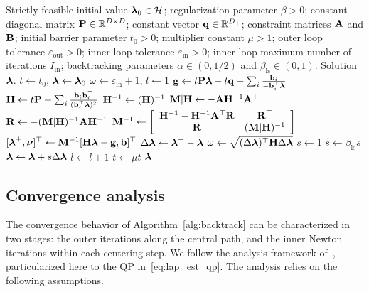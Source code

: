 \begin{algorithm}[t]
	\caption{Laplacian projection via IPM}
	\label{alg:backtrack}
	\begin{algorithmic}[1]
		\renewcommand{\algorithmicrequire}{\textbf{Input:}}
		\renewcommand{\algorithmicensure}{\textbf{Output:}}
		\Require Strictly feasible initial value $\boldsymbol{\lambda}_0\in\mathcal{H}$; regularization parameter $\beta>0$; constant diagonal matrix $\mathbf{P}\in\mathbb{R}^{D\times D}$; constant vector $\mathbf{q}\in\mathbb{R}^{D_+}$; constraint matrices $\mathbf{A}$ and $\mathbf{B}$; initial barrier parameter $t_0>0$; multiplier constant $\mu>1$; outer loop tolerance $\varepsilon_\text{out}>0$; inner loop tolerance $\varepsilon_\text{in}>0$; inner loop maximum number of iterations $I_\text{in}$; backtracking parameters $\alpha\in(0,1/2)$ and $\beta_\text{ls}\in(0,1)$.
		\Ensure Solution $\boldsymbol{\lambda}$.
		\State $t\gets t_0$, $\boldsymbol{\lambda}\gets \boldsymbol{\lambda}_0$
		\State $\omega\gets \varepsilon_\text{in}+1$, $l\gets 1$
		\State $\mathbf{g} \gets t\mathbf{P}\boldsymbol{\lambda} - t\mathbf{q} + \sum_i\frac{\mathbf{b}_i}{-\mathbf{b}_i^\top\boldsymbol{\lambda}}$
		\State $\mathbf{H}\gets t\mathbf{P} + \sum_i\frac{\mathbf{b}_i\mathbf{b}_i^\top}{(\mathbf{b}_i^\top\boldsymbol{\lambda})^2}$
		\State $\mathbf{H}^{-1}\gets (\mathbf{H})^{-1}$
		\State $\mathbf{M}|\mathbf{H}\gets -\mathbf{A}\mathbf{H}^{-1}\mathbf{A}^\top$
		\State $\mathbf{R}\gets -(\mathbf{M}|\mathbf{H})^{-1}\mathbf{A}\mathbf{H}^{-1}$
		\State $\mathbf{M}^{-1} \gets \left[
		\begin{array}{cc}
			\mathbf{H}^{-1} - \mathbf{H}^{-1}\mathbf{A}^\top\mathbf{R}  & \mathbf{R}^\top \\
			\mathbf{R} & (\mathbf{M}|\mathbf{H})^{-1}
		\end{array}
		\right]$
		\State $[\boldsymbol{\lambda}^+, \boldsymbol{\nu}]^\top \gets \mathbf{M}^{-1}[\mathbf{H}\boldsymbol{\lambda}-\mathbf{g},\mathbf{b}]^\top$
		\State $\Delta\boldsymbol{\lambda} \gets \boldsymbol{\lambda}^+ - \boldsymbol{\lambda}$
		\State $\omega\gets\sqrt{(\Delta\boldsymbol{\lambda})^\top\mathbf{H}\Delta\boldsymbol{\lambda}}$
		\State $s\gets 1$
		\State $s\gets \beta_\text{ls} s$
		\EndWhile
		\State $\boldsymbol{\lambda}\gets \boldsymbol{\lambda}+s\Delta\boldsymbol{\lambda}$
		\State $l\gets l+1$
		\EndWhile
		\State $t\gets \mu t$
		\EndWhile
		\Return $\boldsymbol{\lambda}$
	\end{algorithmic} 
\end{algorithm}

\subsection{Convergence analysis}
\label{sec:ipm_conv_analysis}

The convergence behavior of Algorithm~\ref{alg:backtrack} can be characterized in two stages: the outer iterations along the central path, and the inner Newton iterations within each centering step. We follow the analysis framework of~\cite{ipm,nesterov1994interior}, particularized here to the QP in~\eqref{eq:lap_est_qp}. The analysis relies on the following assumptions.

